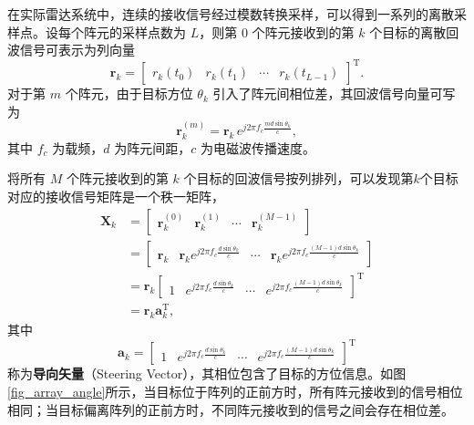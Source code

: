 在实际雷达系统中，连续的接收信号经过模数转换采样，可以得到一系列的离散采样点。设每个阵元的采样点数为 \(L\)，则第 \(0\) 个阵元接收到的第 \(k\) 个目标的离散回波信号可表示为列向量
\[
    \bm{r}_k =
    \begin{bmatrix}
        r_k(t_0) & r_k(t_1) & \cdots & r_k(t_{L-1})
    \end{bmatrix}^{\mathrm{T}}.
\]
对于第 \(m\) 个阵元，由于目标方位 \(\theta_k\) 引入了阵元间相位差，其回波信号向量可写为
\[
    \bm{r}^{(m)}_k
    = \bm{r}_k \, e^{j 2 \pi f_c \frac{m d \sin\theta_k}{c}},
\]
其中 \(f_c\) 为载频，\(d\) 为阵元间距，\(c\) 为电磁波传播速度。

将所有 \(M\) 个阵元接收到的第 \(k\) 个目标的回波信号按列排列，可以发现第\( k \)个目标对应的接收信号矩阵是一个秩一矩阵，
\[
    \begin{aligned}
        \mathbf{X}_k
         & = \begin{bmatrix}
                 \bm{r}_k^{(0)} & \bm{r}_k^{(1)} & \cdots & \bm{r}_k^{(M-1)}
             \end{bmatrix}                                                           \\
         & = \begin{bmatrix}
                 \bm{r}_k & \bm{r}_k e^{j 2 \pi f_c \frac{d \sin\theta_k}{c}} & \cdots & \bm{r}_k e^{j 2 \pi f_c \frac{(M-1) d \sin\theta_k}{c}}
             \end{bmatrix} \\
         & = \bm{r}_k
        \begin{bmatrix}
            1 & e^{j 2 \pi f_c \frac{d \sin\theta_k}{c}} & \cdots & e^{j 2 \pi f_c \frac{(M-1) d \sin\theta_k}{c}}
        \end{bmatrix}^{\mathrm{T}}                               \\
         & = \bm{r}_k \bm{a}_k^{\mathrm{T}},
    \end{aligned}
\]
其中
\[
    \bm{a}_k =
    \begin{bmatrix}
        1 & e^{j 2 \pi f_c \frac{d \sin\theta_k}{c}} & \cdots & e^{j 2 \pi f_c \frac{(M-1) d \sin\theta_k}{c}}
    \end{bmatrix}^{\mathrm{T}}
\]
称为\textbf{导向矢量}（Steering Vector），其相位包含了目标的方位信息。如图\ref{fig_array_angle}所示，当目标位于阵列的正前方时，所有阵元接收到的信号相位相同；当目标偏离阵列的正前方时，不同阵元接收到的信号之间会存在相位差。

